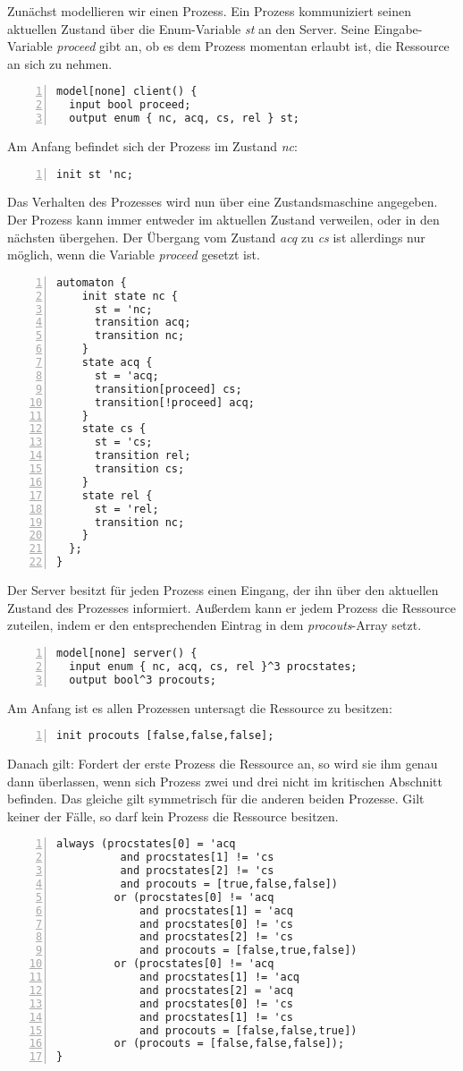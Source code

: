 Zunächst modellieren wir einen Prozess.
Ein Prozess kommuniziert seinen aktuellen Zustand über die Enum-Variable \emph{st} an den Server.
Seine Eingabe-Variable \emph{proceed} gibt an, ob es dem Prozess momentan erlaubt ist, die Ressource an sich zu nehmen.
\begin{lstlisting}[language=gtl,numbers=left]
model[none] client() {
  input bool proceed;
  output enum { nc, acq, cs, rel } st;
\end{lstlisting}
Am Anfang befindet sich der Prozess im Zustand \emph{nc}:
\begin{lstlisting}[language=gtl,numbers=left,firstnumber=last]
  init st 'nc;
\end{lstlisting}
Das Verhalten des Prozesses wird nun über eine Zustandsmaschine angegeben.
Der Prozess kann immer entweder im aktuellen Zustand verweilen, oder in den nächsten übergehen.
Der Übergang vom Zustand \emph{acq} zu \emph{cs} ist allerdings nur möglich, wenn die Variable \emph{proceed} gesetzt ist.
\begin{lstlisting}[language=gtl,numbers=left,firstnumber=last]
  automaton {
    init state nc {
      st = 'nc;
      transition acq;
      transition nc;
    }
    state acq {
      st = 'acq;
      transition[proceed] cs;
      transition[!proceed] acq;
    }
    state cs {
      st = 'cs;
      transition rel;
      transition cs;
    }
    state rel {
      st = 'rel;
      transition nc;
    }
  };
}
\end{lstlisting}
Der Server besitzt für jeden Prozess einen Eingang, der ihn über den aktuellen Zustand des Prozesses informiert.
Außerdem kann er jedem Prozess die Ressource zuteilen, indem er den entsprechenden Eintrag in dem \emph{procouts}-Array setzt.
\begin{lstlisting}[language=gtl,numbers=left,firstnumber=last]
model[none] server() {
  input enum { nc, acq, cs, rel }^3 procstates;
  output bool^3 procouts;
\end{lstlisting}
Am Anfang ist es allen Prozessen untersagt die Ressource zu besitzen:
\begin{lstlisting}[language=gtl,numbers=left,firstnumber=last]
  init procouts [false,false,false];
\end{lstlisting}
Danach gilt: Fordert der erste Prozess die Ressource an, so wird sie ihm genau dann überlassen, wenn sich Prozess zwei und drei nicht im kritischen Abschnitt befinden.
Das gleiche gilt symmetrisch für die anderen beiden Prozesse.
Gilt keiner der Fälle, so darf kein Prozess die Ressource besitzen.
\begin{lstlisting}[language=gtl,numbers=left,firstnumber=last]
  always (procstates[0] = 'acq
          and procstates[1] != 'cs
          and procstates[2] != 'cs
          and procouts = [true,false,false])
         or (procstates[0] != 'acq 
             and procstates[1] = 'acq
             and procstates[0] != 'cs
             and procstates[2] != 'cs
             and procouts = [false,true,false])
         or (procstates[0] != 'acq
             and procstates[1] != 'acq
             and procstates[2] = 'acq
             and procstates[0] != 'cs
             and procstates[1] != 'cs
             and procouts = [false,false,true])
         or (procouts = [false,false,false]);
}
\end{lstlisting}
